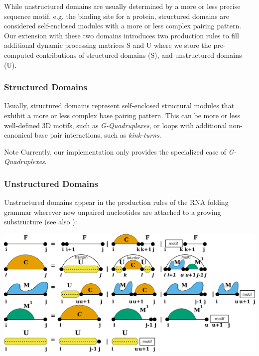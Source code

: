 While unstructured domains are usually determined by a more or less precise sequence motif, e.\+g. the binding site for a protein, structured domains are considered self-\/enclosed modules with a more or less complex pairing pattern. Our extension with these two domains introduces two production rules to fill additional dynamic processing matrices {\ttfamily S} and {\ttfamily U} where we store the pre-\/computed contributions of structured domains ({\ttfamily S}), and unstructured domains ({\ttfamily U}).\hypertarget{folding_grammar_sec_domains_structured}{}\subsubsection{Structured Domains}\label{folding_grammar_sec_domains_structured}
Usually, structured domains represent self-\/enclosed structural modules that exhibit a more or less complex base pairing pattern. This can be more or less well-\/defined 3D motifs, such as {\itshape G-\/\+Quadruplexes}, or loops with additional non-\/canonical base pair interactions, such as {\itshape kink-\/turns}.

\begin{DoxyNote}{Note}
Currently, our implementation only provides the specialized case of {\itshape G-\/\+Quadruplexes}.
\end{DoxyNote}
\hypertarget{folding_grammar_sec_domains_up}{}\subsubsection{Unstructured Domains}\label{folding_grammar_sec_domains_up}
Unstructured domains appear in the production rules of the R\+NA folding grammar wherever new unpaired nucleotides are attached to a growing substructure (see also \cite{lorenz:2016b})\+:  
\begin{DoxyImageNoCaption}
  \mbox{\includegraphics[width=\textwidth,height=\textheight/2,keepaspectratio=true]{Crecursion}}
\end{DoxyImageNoCaption}


